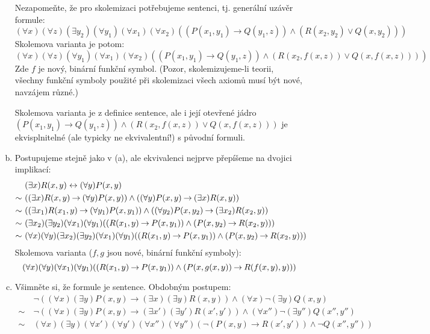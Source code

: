 \begin{problem}
\begin{solution}
\begin{enumerate}[(a)]
            Nezapomeňte, že pro skolemizaci potřebujeme sentenci, tj. generální uzávěr formule:
            $$
            (\forall x)(\forall z)(\exists y_2)(\forall y_1)(\forall x_1)(\forall x_2)((P(x_1,y_1)\to Q(y_1,z))\wedge (R(x_2,y_2)\vee Q(x,y_2)))
            $$
            Skolemova varianta je potom:
            $$
            (\forall x)(\forall z)(\forall y_1)(\forall x_1)(\forall x_2)((P(x_1,y_1)\to Q(y_1,z))\wedge (R(x_2,f(x,z))\vee Q(x,f(x,z))))
            $$
            Zde $f$ je nový, binární funkční symbol. (Pozor, skolemizujeme-li teorii, všechny funkční symboly použité při skolemizaci všech axiomů musí být nové, navzájem různé.)

            Skolemova varianta je z definice sentence, ale i její otevřené jádro $(P(x_1,y_1)\to Q(y_1,z))\wedge (R(x_2,f(x,z))\vee Q(x,f(x,z)))$ je ekvisplnitelné (ale typicky ne ekvivalentní!) s původní formuli.
            
            \item Postupujeme stejně jako v (a), ale ekvivalenci nejprve přepíšeme na dvojici implikací:
            \begin{align*}
                &(\exists x)R(x,y)\leftrightarrow (\forall y)P(x,y)\\
                \sim\ &((\exists x)R(x,y)\mathbin{\rightarrow} (\forall y)P(x,y))\land((\forall y)P(x,y)\mathbin{\rightarrow} (\exists x)R(x,y))\\
                \sim\ &((\exists x_1)R(x_1,y)\mathbin{\rightarrow} (\forall y_1)P(x,y_1))\land((\forall y_2)P(x,y_2)\mathbin{\rightarrow} (\exists x_2)R(x_2,y))\\
                \sim\ &(\exists x_2)(\exists y_2)(\forall x_1)(\forall y_1)((R(x_1,y)\mathbin{\rightarrow} P(x,y_1))\land(P(x,y_2)\mathbin{\rightarrow} R(x_2,y)))\\
                \sim\ &(\forall x)(\forall y)(\exists x_2)(\exists y_2)(\forall x_1)(\forall y_1)((R(x_1,y)\mathbin{\rightarrow} P(x,y_1))\land(P(x,y_2)\mathbin{\rightarrow} R(x_2,y)))
            \end{align*}
            Skolemova varianta ($f,g$ jsou nové, binární funkční symboly):
            $$
            (\forall x)(\forall y)(\forall x_1)(\forall y_1)((R(x_1,y)\mathbin{\rightarrow} P(x,y_1))\land(P(x,g(x,y))\mathbin{\rightarrow} R(f(x,y),y)))
            $$

            \item Všimněte si, že formule je sentence. Obdobným postupem:
            \begin{align*}
            &\neg((\forall x)(\exists y)P(x,y)\to (\exists x)(\exists y)R(x,y))\wedge(\forall x)\neg(\exists y)Q(x,y)\\
            \sim\ &\neg((\forall x)(\exists y)P(x,y)\to (\exists x')(\exists y')R(x',y'))\wedge(\forall x'')\neg(\exists y'')Q(x'',y'')\\
            \sim\ & (\forall x)(\exists y)(\forall x')(\forall y')(\forall x'')(\forall y'')
            (    
                \neg(P(x,y)\to R(x',y'))\wedge\neg Q(x'',y'') 
            )
            \end{align*}
            

\end{enumerate}
\end{solution}
\end{problem}
